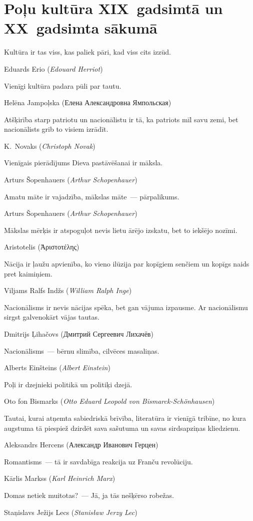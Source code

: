 \documentclass[twoside,a5paper,12pt,fleqn,openany]{extbook}
\newcommand{\pltxti}[1]{\textit{\textpolish{#1}}}
\newcommand{\rutxti}[1]{\textrussian{#1}}
\newcommand{\detxti}[1]{\textit{\textgerman{#1}}}
\newcommand{\frtxti}[1]{\textit{\textfrench{#1}}}
\newcommand{\entxti}[1]{\textit{\textenglish{#1}}}
\newcommand{\eltxti}[1]{\textgreek{#1}}
\begin{document}
\section{Poļu kultūra XIX~gadsimtā un XX~gadsimta sākumā}

\epigraph
{Kultūra ir tas viss, kas paliek pāri, kad viss cits izzūd.}
{Eduards Erio (\frtxti{Edouard Herriot})}

\epigraph
{Vienīgi kultūra padara pūli par tautu.}
{Helēna Jampoļska (\rutxti{Елена Александровна Ямпольская})}

\epigraph
{Atšķirība starp patriotu un nacionālistu ir tā, ka patriots mīl savu zemi, bet nacionālists grib to visiem izrādīt.}
{K.~Novaks (\entxti{Christoph Novak})}

\epigraph
{Vienīgais pierādījums Dieva pastāvēšanai ir māksla.}
{Arturs Šopenhauers (\detxti{Arthur Schopenhauer})}

\epigraph
{Amatu māte ir vajadzība, mākslas māte~--- pārpalikums.}
{Arturs Šopenhauers (\detxti{Arthur Schopenhauer})}

\epigraph
{Mākslas mērķis ir atspoguļot nevis lietu ārējo izskatu, bet to iekšējo nozīmi.}
{Aristotelis (\eltxti{Ἀριστοτέλης})}

\epigraph
{Nācija ir ļaužu apvienība, ko vieno ilūzija par kopīgiem senčiem un kopīgs naids pret kaimiņiem.}
{Viljams Ralfs Indžs (\entxti{William Ralph Inge})}

\epigraph
{Nacionālisms ir nevis nācijas spēka, bet gan vājuma izpausme. Ar nacionālismu sirgst galvenokārt vājas tautas.}
{Dmitrijs Ļihačovs (\rutxti{Дмитрий Сергеевич Лихачёв})}

\epigraph
{Nacionālisms~--- bērnu slimība, cilvēces masaliņas.}
{Alberts Einšteins (\detxti{Albert Einstein})}

\epigraph
{Poļi ir dzejnieki politikā un politiķi dzejā.}
{Oto fon Bismarks (\detxti{Otto Eduard Leopold von Bismarck-Schönhausen})}

\epigraph
{Tautai, kurai atņemta sabiedriskā brīvība, literatūra ir vienīgā tribīne, no kura augstuma tā piespiež dzirdēt sava sašutuma un savas sirdsapziņas kliedzienu.}
{Aleksandrs Hercens (\rutxti{Александр Иванович Герцен})}

\epigraph
{Romantisms~--- tā ir savdabīga reakcija uz Franču revolūciju.}
{Kārlis Markss (\detxti{Karl Heinrich Marx})}

\epigraph
{Domas netiek muitotas?~--- Jā, ja tās nešķērso robežas.}
{Staņislavs Ježijs Lecs (\pltxti{Stanisław Jerzy Lec})}
\end{document}
